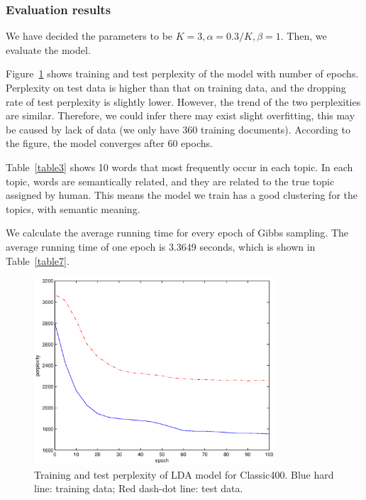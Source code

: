 \documentclass{article} %
\begin{document}
\subsubsection{Evaluation results}
We have decided the parameters to be $K = 3, \alpha = 0.3/K, \beta =1$. Then, we evaluate the model.
\par
Figure~\ref{per1} shows training and test perplexity of the model with number of epochs. Perplexity on test data is higher than that on training data, and the dropping rate of test perplexity is slightly lower. However, the trend of the two perplexities are similar. Therefore, we could infer there may exist slight overfitting, this may be caused by lack of data (we only have 360 training documents). According to the figure, the model converges after 60 epochs.
\par
Table~\ref{table3} shows 10 words that most frequently occur in each topic. In each topic, words are semantically related, and they are related to the true topic assigned by human. This means the model we train has a good clustering for the topics, with semantic meaning.
\par
We calculate the average running time for every epoch of Gibbs sampling. The average running time of one epoch is 3.3649 seconds, which is shown in Table~\ref{table7}. 
\begin{figure}
\centering
\includegraphics[width=0.8\textwidth]{perplex1}
\caption{Training and test perplexity of LDA model for Classic400. Blue hard line: training data; Red dash-dot line: test data.}
\label{per1}
\end{figure}
\end{document}
